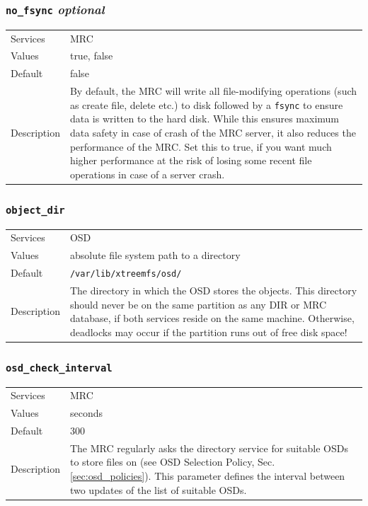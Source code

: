 \documentclass[a4paper,10pt]{book}
\begin{document}
\subsubsection{\texttt{no\_fsync} \textit{optional}}
\begin{tabular}{lp{10cm}}
 Services & MRC\\
 Values   & true, false \\
 Default  & false\\
 Description & By default, the MRC will write all file-modifying operations (such as create file, delete etc.) to disk followed by a \texttt{fsync} to ensure data is written to the hard disk. While this ensures maximum data safety in case of crash of the MRC server, it also reduces the performance of the MRC. Set this to true, if you want much higher performance at the risk of losing some recent file operations in case of a server crash.
\end{tabular}

\subsubsection{\texttt{object\_dir}}
\begin{tabular}{lp{10cm}}
 Services & OSD\\
 Values   & absolute file system path to a directory\\
 Default  & \texttt{/var/lib/xtreemfs/osd/}\\
 Description & The directory in which the OSD stores the objects. This directory should never be on the same partition as any DIR or MRC database, if both services reside on the same machine. Otherwise, deadlocks may occur if the partition runs out of free disk space!
\end{tabular}

\subsubsection{\texttt{osd\_check\_interval}}
\begin{tabular}{lp{10cm}}
 Services & MRC\\
 Values   & seconds \\
 Default  & 300\\
 Description & The MRC regularly asks the directory service for suitable OSDs to store files on (see OSD Selection Policy, Sec. \ref{sec:osd_policies}). This parameter defines the interval between two updates of the list of suitable OSDs.
\end{tabular}
\end{document}
